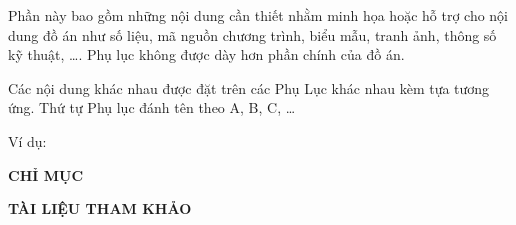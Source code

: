 \documentclass[12pt,a4paper]{report}
\begin{document}
\vspace{0.8cm}

Phần này bao gồm những nội dung cần thiết nhằm minh họa hoặc hỗ trợ cho nội dung đồ án như số liệu, mã nguồn chương trình, biểu mẫu, tranh ảnh, thông số kỹ thuật, \dots. Phụ lục không được dày hơn phần chính của đồ án.

Các nội dung khác nhau được đặt trên các Phụ Lục khác nhau kèm tựa tương ứng. Thứ tự Phụ lục đánh tên theo A, B, C, \dots

Ví dụ:



\newpage

\begin{center}
    {\fontsize{13}{16}\selectfont\bfseries CHỈ MỤC}
\end{center}

\vspace{0.8cm}


\newpage

\begin{center}
    {\fontsize{13}{16}\selectfont\bfseries TÀI LIỆU THAM KHẢO}
\end{center}

\vspace{0.8cm}

\end{document}
